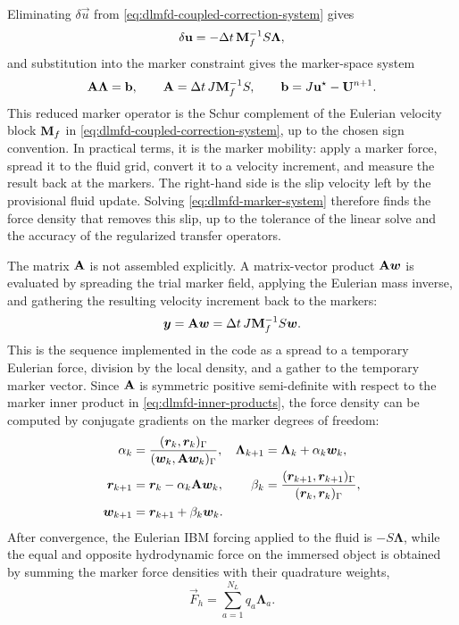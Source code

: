 Eliminating \(\delta\vec u\) from \eqref{eq:dlmfd-coupled-correction-system}
gives
\begin{equation}
    \delta\mathbf{u}
    =
    -\Delta t\,\mathbf{M}_f^{-1}S\bm\Lambda,
    \label{eq:dlmfd-eliminated-velocity-correction}
\end{equation}
and substitution into the marker constraint gives the marker-space system
\begin{equation}
    \mathbf{A}\bm\Lambda = \mathbf{b},
    \qquad
    \mathbf{A} = \Delta t\,J\mathbf{M}_f^{-1}S,
    \qquad
    \mathbf{b} = J\mathbf{u}^\star-\mathbf{U}^{n+1}.
    \label{eq:dlmfd-marker-system}
\end{equation}
This reduced marker operator is the Schur complement of the Eulerian velocity
block \(\mathbf{M}_f\) in \eqref{eq:dlmfd-coupled-correction-system}, up to the
chosen sign convention. In practical terms, it is the marker mobility: apply a
marker force, spread it to the fluid grid, convert it to a velocity increment,
and measure the result back at the markers.
The right-hand side is the slip velocity left by the provisional fluid update.
Solving \eqref{eq:dlmfd-marker-system} therefore finds the force density that
removes this slip, up to the tolerance of the linear solve and the accuracy of
the regularized transfer operators.

The matrix \(\mathbf{A}\) is not assembled explicitly. A matrix-vector product
\(\mathbf{A}\bm w\) is evaluated by spreading the trial marker field, applying the
Eulerian mass inverse, and gathering the resulting velocity increment back to
the markers:
\begin{equation}
    \bm y = \mathbf{A}\bm w
    = \Delta t\,J\mathbf{M}_f^{-1}S\bm w .
    \label{eq:dlmfd-matvec}
\end{equation}
This is the sequence implemented in the code as a spread to a temporary
Eulerian force, division by the local density, and a gather to the temporary
marker vector. Since \(\mathbf{A}\) is symmetric positive semi-definite with
respect to the marker inner product in \eqref{eq:dlmfd-inner-products}, the
force density can be computed by conjugate gradients on the marker degrees of
freedom:
\begin{align}
    \alpha_k         & =
    \frac{(\bm r_k,\bm r_k)_\Gamma}
    {(\bm w_k,\mathbf{A}\bm w_k)_\Gamma},
                     &
    \bm\Lambda_{k+1} & =
    \bm\Lambda_k+\alpha_k\bm w_k,
    \label{eq:dlmfd-cg-alpha} \\
    \bm r_{k+1}      & =
    \bm r_k-\alpha_k\mathbf{A}\bm w_k,
                     &
    \beta_k          & =
    \frac{(\bm r_{k+1},\bm r_{k+1})_\Gamma}
    {(\bm r_k,\bm r_k)_\Gamma},
    \label{eq:dlmfd-cg-beta}  \\
    \bm w_{k+1}      & =
    \bm r_{k+1}+\beta_k\bm w_k .
    \label{eq:dlmfd-cg-direction}
\end{align}
After convergence, the Eulerian IBM forcing applied to the fluid is
\(-S\bm\Lambda\), while the equal and opposite hydrodynamic force on the
immersed object is obtained by summing the marker force densities with their
quadrature weights,
\begin{equation}
    \vec F_h = \sum_{a=1}^{N_L} q_a\bm\Lambda_a .
    \label{eq:dlmfd-hydrodynamic-force}
\end{equation}

